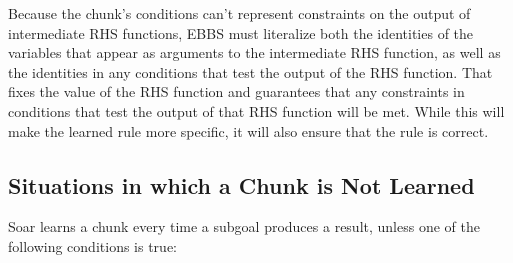 Because the chunk's conditions can't represent constraints on the output of intermediate RHS functions, EBBS must literalize both the identities of the variables that appear as arguments to the intermediate RHS function, as well as the identities in any conditions that test the output of the RHS function.  That fixes the value of the RHS function and guarantees that any constraints in conditions that test the output of that RHS function will be met.  While this will make the learned rule more specific, it will also ensure that the rule is correct.

\subsection{Situations in which a Chunk is Not Learned}

Soar learns a chunk every time a subgoal produces a result, unless one of the following conditions is true:

